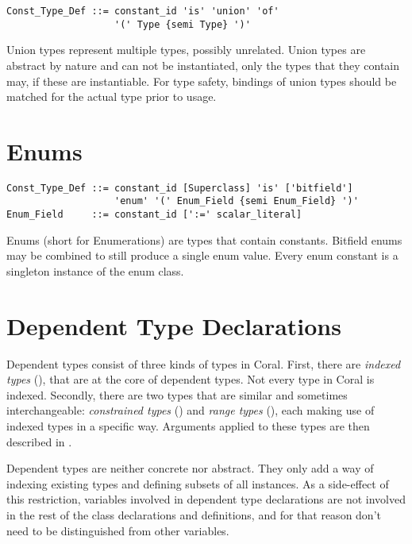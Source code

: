 \syntax\begin{lstlisting}
Const_Type_Def ::= constant_id 'is' 'union' 'of'
                   '(' Type {semi Type} ')'
\end{lstlisting}

Union types represent multiple types, possibly unrelated. Union types are abstract by nature and can not be instantiated, only the types that they contain may, if these are instantiable. For type safety, bindings of union types should be matched for the actual type prior to usage. 

\section{Enums}
\label{sec:enums}

\syntax\begin{lstlisting}
Const_Type_Def ::= constant_id [Superclass] 'is' ['bitfield'] 
                   'enum' '(' Enum_Field {semi Enum_Field} ')'
Enum_Field     ::= constant_id [':=' scalar_literal]
\end{lstlisting}


Enums (short for Enumerations) are types that contain constants. Bitfield enums may be combined to still produce a single enum value. Every enum constant is a singleton instance of the enum class. 

\section{Dependent Type Declarations}
\label{sec:dependent-types-decl}

Dependent types consist of three kinds of types in Coral. First, there are {\em indexed types} (), that are at the core of dependent types. Not every type in Coral is indexed. Secondly, there are two types that are similar and sometimes interchangeable: {\em constrained types} () and {\em range types} (), each making use of indexed types in a specific way. Arguments applied to these types are then described in . 

Dependent types are neither concrete nor abstract. They only add a way of indexing existing types and defining subsets of all instances. As a side-effect of this restriction, variables involved in dependent type declarations are not involved in the rest of the class declarations and definitions, and for that reason don't need to be distinguished from other variables. 

